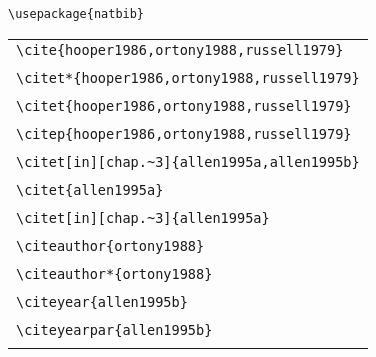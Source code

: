 \documentclass{article}
\begin{document}
\verb#\usepackage{natbib}#\\

\begin{center}
\begin{tabular}{l}
\verb#\cite{hooper1986,ortony1988,russell1979}# \\
\cite{hooper1986,ortony1988,russell1979}  \\\hline 
\verb#\citet*{hooper1986,ortony1988,russell1979}# \\
 \citet*{hooper1986,ortony1988,russell1979}  \\\hline
\verb#\citet{hooper1986,ortony1988,russell1979}# \\
 \citet{hooper1986,ortony1988,russell1979}  \\\hline
\verb#\citep{hooper1986,ortony1988,russell1979}# \\
 \citep{hooper1986,ortony1988,russell1979}  \\\hline
\verb#\citet[in][chap.~3]{allen1995a,allen1995b}# \\
 \citet[in][chap.~3]{allen1995a,allen1995b} \\\hline
\verb#\citet{allen1995a}# \\
 \citet{allen1995a} \\\hline
\verb#\citet[in][chap.~3]{allen1995a}# \\
 \citet[in][chap.~3]{allen1995a} \\\hline
\verb#\citeauthor{ortony1988}# \\
 \citeauthor{ortony1988} \\\hline
\verb#\citeauthor*{ortony1988}# \\
 \citeauthor*{ortony1988} \\\hline
\verb#\citeyear{allen1995b}# \\
 \citeyear{allen1995b} \\\hline
\verb#\citeyearpar{allen1995b}# \\
 \citeyearpar{allen1995b} \\\hline
\end{tabular}
\end{center}
\end{document}
